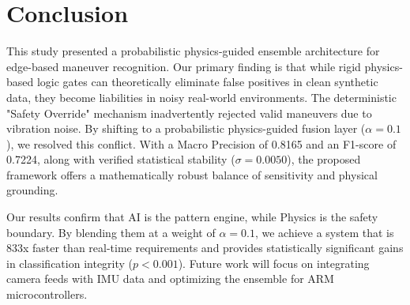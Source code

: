 \documentclass[pdflatex,sn-mathphys-num]{sn-jnl}
\theoremstyle{thmstyleone}
\theoremstyle{thmstyletwo}
\theoremstyle{thmstylethree}
\begin{document}
\FloatBarrier
\section{Conclusion}\label{sec:conclusion}
This study presented a probabilistic physics-guided ensemble architecture for edge-based maneuver recognition. Our primary finding is that while rigid physics-based logic gates can theoretically eliminate false positives in clean synthetic data, they become liabilities in noisy real-world environments. The deterministic "Safety Override" mechanism inadvertently rejected valid maneuvers due to vibration noise. By shifting to a probabilistic physics-guided fusion layer ($\alpha=0.1$), we resolved this conflict. With a Macro Precision of 0.8165 and an F1-score of 0.7224, along with verified statistical stability ($\sigma=0.0050$), the proposed framework offers a mathematically robust balance of sensitivity and physical grounding. 

Our results confirm that AI is the pattern engine, while Physics is the safety boundary. By blending them at a weight of $\alpha=0.1$, we achieve a system that is 833x faster than real-time requirements and provides statistically significant gains in classification integrity ($p < 0.001$). Future work will focus on integrating camera feeds with IMU data and optimizing the ensemble for ARM microcontrollers.
\end{document}
